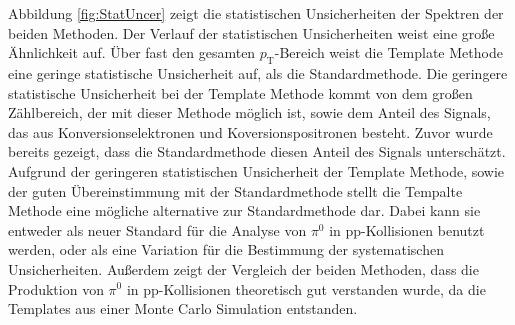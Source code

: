 \newline
Abbildung \ref{fig:StatUncer} zeigt die statistischen Unsicherheiten der Spektren der beiden Methoden.
Der Verlauf der statistischen Unsicherheiten weist eine große Ähnlichkeit auf.
Über fast den gesamten $p_\text{T}$-Bereich weist die Template Methode eine geringe statistische Unsicherheit auf, als die Standardmethode.
Die geringere statistische Unsicherheit bei der Template Methode kommt von dem großen Zählbereich, der mit  dieser Methode möglich ist, sowie dem Anteil des Signals, das aus Konversionselektronen und Koversionspositronen besteht.
Zuvor wurde bereits gezeigt, dass die Standardmethode diesen Anteil des Signals unterschätzt.
\newline
Aufgrund der geringeren statistischen Unsicherheit der Template Methode, sowie der guten Über\-ein\-stim\-mung mit der Standardmethode stellt die Tempalte Methode eine mögliche alternative zur Standardmethode dar.
Dabei kann sie entweder als neuer Standard für die Analyse von $\pi^{0}$ in pp-Kollisionen benutzt werden, oder als eine Variation für die Bestimmung der systematischen Unsicherheiten.
\newline
Außerdem zeigt der Vergleich der beiden Methoden, dass die Produktion von $\pi^{0}$ in pp-Kollisionen theoretisch gut verstanden wurde, da die Templates aus einer Monte Carlo Simulation entstanden.
